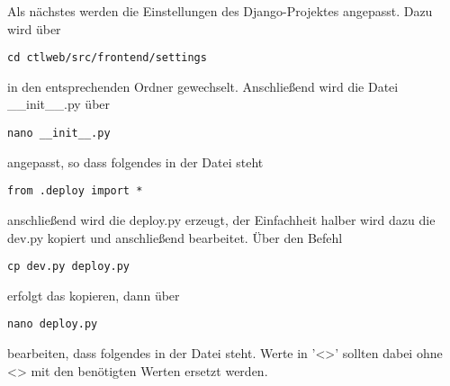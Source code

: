 Als nächstes werden die Einstellungen des Django-Projektes angepasst. Dazu
wird über
\begin{lstlisting}
cd ctlweb/src/frontend/settings
\end{lstlisting}
in den entsprechenden Ordner gewechselt. Anschließend wird die Datei
__init__.py über 
\begin{lstlisting}
nano __init__.py
\end{lstlisting}
angepasst, so dass folgendes in der Datei steht
\begin{lstlisting}
from .deploy import *
\end{lstlisting}
anschließend wird die deploy.py erzeugt, der Einfachheit halber wird dazu die
dev.py kopiert und anschließend bearbeitet. Über den Befehl 
\begin{lstlisting}
cp dev.py deploy.py
\end{lstlisting}
erfolgt das kopieren, dann über 
\begin{lstlisting}
nano deploy.py
\end{lstlisting}
bearbeiten, dass folgendes in der Datei steht. Werte in '<>' sollten dabei ohne
<> mit den benötigten Werten ersetzt werden.
